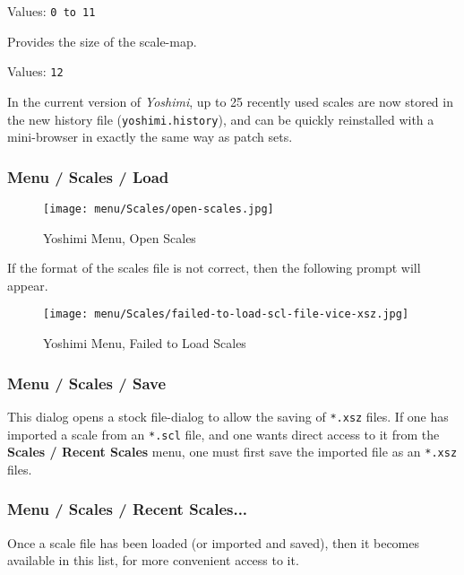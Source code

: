    Values: \texttt{0 to 11}

   Provides the size of the scale-map.

   Values: \texttt{12}

   In the current version of \textsl{Yoshimi}, up to 25 recently used scales are
   now stored in the new history file
   (\texttt{yoshimi.history}), and can be quickly reinstalled with a
   mini-browser in exactly the same way as patch sets.

\subsubsection{Menu / Scales / Load}
\label{subsec:menu_scales_load}

\begin{figure}[H]
   \centering 
   \texttt{[image: menu/Scales/open-scales.jpg]}
   \caption{Yoshimi Menu, Open Scales}
   \label{fig:yoshimi_menu_open_scales}
\end{figure}

   If the format of the scales file is not correct, then the following prompt
   will appear.

\begin{figure}[H]
   \centering 
   \texttt{[image: menu/Scales/failed-to-load-scl-file-vice-xsz.jpg]}
   \caption{Yoshimi Menu, Failed to Load Scales}
   \label{fig:yoshimi_menu_failed_to_load_scales}
\end{figure}

\subsubsection{Menu / Scales / Save}
\label{subsec:menu_scales_save}

   This dialog opens a stock file-dialog to allow the saving of
   \texttt{*.xsz} files.
   If one has imported a scale from an \texttt{*.scl} file, and one
   wants direct access to it from the \textbf{Scales / Recent Scales} menu, one
   must first save the imported file as an \texttt{*.xsz} files.

\subsubsection{Menu / Scales / Recent Scales...}
\label{subsec:menu_scales_recent_scales}

   Once a scale file has been loaded (or imported and saved), then it
   becomes available in this list, for more convenient access to it.

